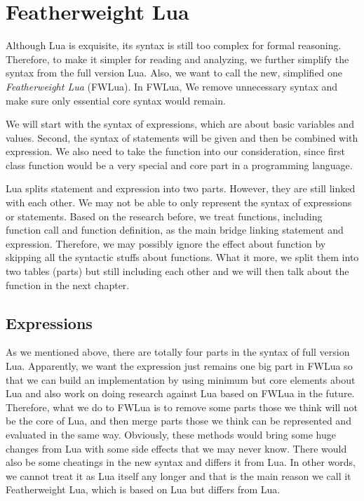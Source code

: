 \chapter{Featherweight Lua}
Although Lua is exquisite, its syntax is still too complex for formal reasoning. Therefore, to make it simpler for reading and analyzing, we further simplify the syntax from the full version Lua. Also, we want to call the new, simplified one {\it Featherweight Lua} (FWLua). In FWLua, We remove unnecessary syntax and make sure only essential core syntax would remain.

We will start with the syntax of expressions, which are about basic variables and values. Second, the syntax of statements will be given and then be combined with expression. We also need to take the function into our consideration, since first class function would be a very special and core part in a programming language.

Lua splits statement and expression into two parts. However, they are still linked with each other. We may not be able to only represent the syntax of expressions or statements. Based on the research before, we treat functions, including function call and function definition, as the main bridge linking statement and expression. Therefore, we may possibly ignore the effect about function by skipping all the syntactic stuffs about functions. What it more, we split them into two tables (parts) but still including each other and we will then talk about the function in the next chapter.

\section{Expressions}
As we mentioned above, there are totally four parts in the syntax of full version Lua. Apparently, we want the expression just remains one big part in FWLua so that we can build an implementation by using minimum but core elements about Lua and also work on doing research against Lua based on FWLua in the future. Therefore, what we do to FWLua is to remove some parts those we think will not be the core of Lua, and then merge parts those we think can be represented and evaluated in the same way. Obviously, these methods would bring some huge changes from Lua with some side effects that we may never know. There would also be some cheatings in the new syntax and differs it from Lua. In other words, we cannot treat it as Lua itself any longer and that is the main reason we call it Featherweight Lua, which is based on Lua but differs from Lua.

